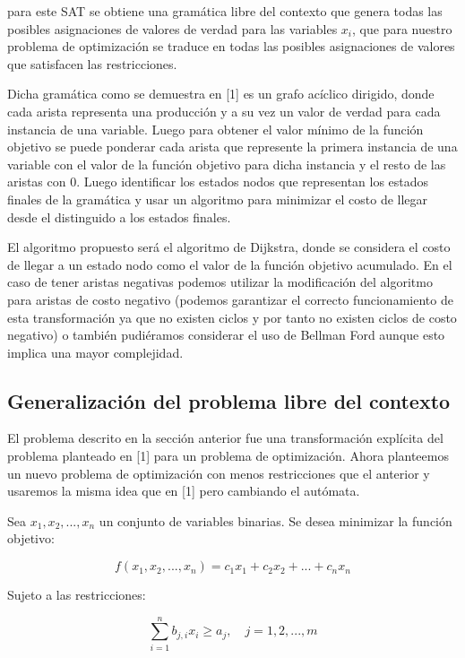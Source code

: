 \documentclass{article}
\begin{document}
para este SAT se obtiene una gramática libre del contexto que genera todas las posibles asignaciones de valores de verdad para las variables $x_i$,
que para nuestro problema de optimización se traduce en todas las posibles asignaciones de valores que satisfacen las restricciones.

Dicha gramática como se demuestra en [1] es un grafo acíclico dirigido, donde cada arista representa una producción y a su vez un valor de verdad
para cada instancia de una variable. Luego para obtener el valor mínimo de la función objetivo se puede ponderar cada arista que represente la primera instancia
de una variable con el valor de la función objetivo para dicha instancia y el resto de las aristas con 0. Luego identificar los estados nodos que representan los estados finales de la gramática 
y usar un algoritmo para minimizar el costo de llegar desde el distinguido a los estados finales.

El algoritmo propuesto será el algoritmo de Dijkstra, donde se considera el costo de llegar a un estado nodo como el valor de la función objetivo acumulado.
En el caso de tener aristas negativas podemos utilizar la modificación del algoritmo para aristas de costo negativo (podemos garantizar el correcto funcionamiento
de esta transformación ya que no existen ciclos y por tanto no existen ciclos de costo negativo) o también pudiéramos considerar el uso de Bellman Ford aunque esto
implica una mayor complejidad.
    
\subsection*{Generalización del problema libre del contexto}

El problema descrito en la sección anterior fue una transformación explícita del problema planteado en [1] para un problema de optimización.
Ahora planteemos un nuevo problema de optimización con menos restricciones que el anterior y usaremos la misma idea que en [1] pero cambiando
el autómata.

Sea $x_1, x_2, ..., x_n$ un conjunto de variables binarias. Se desea minimizar la función objetivo:

\begin{equation}
    f(x_1, x_2, ..., x_n) = c_1x_1 + c_2x_2 + ... + c_nx_n
\end{equation}

Sujeto a las restricciones:

\begin{equation}
    \sum_{i = 1}^{n} b_{j,i}x_i \geq a_j, \quad j = 1, 2, ..., m
\end{equation}
\end{document}
